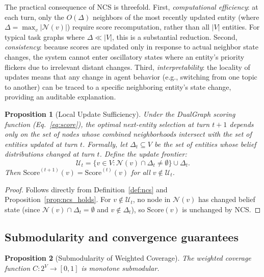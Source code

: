 \documentclass[11pt,a4paper]{article}
\newtheorem{proposition}{Proposition}
\begin{document}
The practical consequence of NCS is threefold. First, \emph{computational
efficiency}: at each turn, only the $O(\Delta)$ neighbors of the most
recently updated entity (where $\Delta = \max_v |\mathcal{N}(v)|$) require
score recomputation, rather than all $|V|$ entities. For typical task graphs
where $\Delta \ll |V|$, this is a substantial reduction. Second,
\emph{consistency}: because scores are updated only in response to actual
neighbor state changes, the system cannot enter oscillatory states where an
entity's priority flickers due to irrelevant distant changes. Third,
\emph{interpretability}: the locality of updates means that any change in
agent behavior (e.g., switching from one topic to another) can be traced to a
specific neighboring entity's state change, providing an auditable explanation.

\begin{proposition}[Local Update Sufficiency]
\label{prop:local_update}
Under the DualGraph scoring function (Eq.~\ref{eq:score}), the optimal
next-entity selection at turn $t+1$ depends only on the set of nodes whose
combined neighborhoods intersect with the set of entities updated at turn $t$.
Formally, let $\Delta_t \subseteq V$ be the set of entities whose belief
distributions changed at turn $t$. Define the \emph{update frontier}:
\[
  \mathcal{U}_t = \bigl\{v \in V : \mathcal{N}(v) \cap \Delta_t
    \neq \emptyset\bigr\} \cup \Delta_t.
\]
Then $\mathrm{Score}^{(t+1)}(v) = \mathrm{Score}^{(t)}(v)$ for all
$v \notin \mathcal{U}_t$.
\end{proposition}

\begin{proof}
Follows directly from Definition~\ref{def:ncs} and
Proposition~\ref{prop:ncs_holds}. For $v \notin \mathcal{U}_t$, no node in
$\mathcal{N}(v)$ has changed belief state (since
$\mathcal{N}(v) \cap \Delta_t = \emptyset$ and $v \notin \Delta_t$),
so $\mathrm{Score}(v)$ is unchanged by NCS.
\end{proof}

\subsection{Submodularity and convergence guarantees}
\label{sec:theory_convergence}

\begin{proposition}[Submodularity of Weighted Coverage]
\label{prop:submodular}
The weighted coverage function $C: 2^V \to [0,1]$ is monotone submodular.
\end{proposition}
\end{document}
